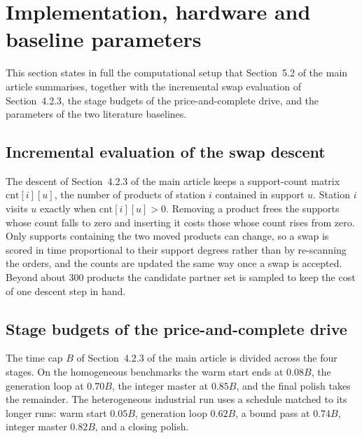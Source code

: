 \documentclass[11pt]{article}
\begin{document}
\begin{algorithm}[H]
\end{algorithm}

\section{Implementation, hardware and baseline parameters}\label{sup:impl}
This section states in full the computational setup that Section~5.2 of the main article
summarises, together with the incremental swap evaluation of Section~4.2.3, the stage budgets of
the price-and-complete drive, and the parameters of the two literature baselines.

\subsection{Incremental evaluation of the swap descent}\label{sup:swapeval}
The descent of Section~4.2.3 of the main article keeps a support-count matrix
$\mathrm{cnt}[i][u]$, the number of products of station $i$ contained in support $u$. Station $i$
visits $u$ exactly when $\mathrm{cnt}[i][u]>0$. Removing a product frees the supports whose count
falls to zero and inserting it costs those whose count rises from zero. Only supports containing
the two moved products can change, so a swap is scored in time proportional to their support
degrees rather than by re-scanning the orders, and the counts are updated the same way once a swap
is accepted. Beyond about 300 products the candidate partner set is sampled to keep the cost of one
descent step in hand.

\subsection{Stage budgets of the price-and-complete drive}\label{sup:budgets}
The time cap $B$ of Section~4.2.3 of the main article is divided across the four stages. On the
homogeneous benchmarks the warm start ends at $0.08B$, the generation loop at $0.70B$, the integer
master at $0.85B$, and the final polish takes the remainder. The heterogeneous industrial run uses
a schedule matched to its longer runs: warm start $0.05B$, generation loop $0.62B$, a bound pass at
$0.74B$, integer master $0.82B$, and a closing polish.
\end{document}

